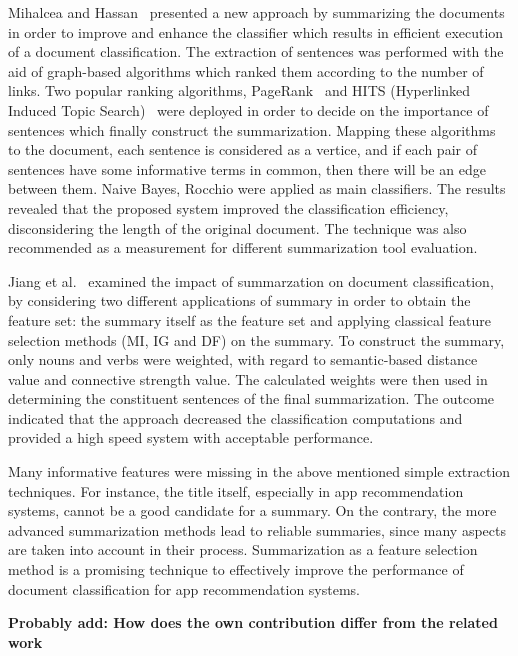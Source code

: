 \documentclass{sigchi}
\begin{document}
Mihalcea and Hassan~\cite{mihalcea2005using} presented a new approach by summarizing the documents in order to improve and enhance the classifier which results in efficient execution of a document classification.
The extraction of sentences was performed with the aid of graph-based algorithms which ranked them according to the number of links. 
Two popular ranking algorithms, PageRank~\cite{Brin20123825} and HITS (Hyperlinked Induced Topic Search)~\cite{Kleinberg:1999:ASH:324133.324140} were deployed in order to decide on the importance of sentences which finally construct the summarization. 
Mapping these algorithms to the document, each sentence is considered as a vertice, and if each pair of sentences have some informative terms in common, then there will be an edge between them. 
Naive Bayes, Rocchio were applied as main classifiers. 
The results revealed that the proposed system improved the classification efficiency, disconsidering the length of the original document. 
The technique was also recommended as a measurement for different summarization tool evaluation.

Jiang et al.~\cite{4797414} examined the impact of summarzation on document classification, by considering two different applications of summary in order to obtain the feature set: the summary itself as the feature set and applying classical feature selection methods (MI, IG and DF) on the summary. 
To construct the summary, only nouns and verbs were weighted, with regard to semantic-based distance value and connective strength value. 
The calculated weights were then used in determining the constituent sentences of the final summarization. 
The outcome indicated that the approach decreased the classification computations and provided a high speed system with acceptable performance.

Many informative features were missing in the above mentioned simple extraction techniques. 
For instance, the title itself, especially in app recommendation systems, cannot be a good candidate for a summary. 
On the contrary, the more advanced summarization methods lead to reliable summaries, since many aspects are taken into account in their process.
Summarization as a feature selection method is a promising technique to effectively improve the performance of document classification for app recommendation systems.

\textbf{Probably add: How does the own contribution differ from the related work}
\end{document}
